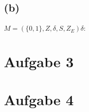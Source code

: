 \documentclass[titlepage]{article}
\renewcommand{\]}{\right]}
\renewcommand{\[}{\left[}
\renewcommand{\)}{\right)}
\renewcommand{\(}{\left(}
\renewcommand{\|}{\;|\;}
\begin{document}
	\subsection*{(b)}
		\tab$M=(\{0,1\},Z,\delta,S,Z_E)$\tab$\delta$:\\
		\begin{center}
			
			
		\end{center}
		
	
	\pagebreak
	\section*{Aufgabe 3}
		\begin{center}
			
			
			
		\end{center}
	
	\section*{Aufgabe 4}
		\begin{center}
			
		\end{center}

	\endgroup	
\end{document}
